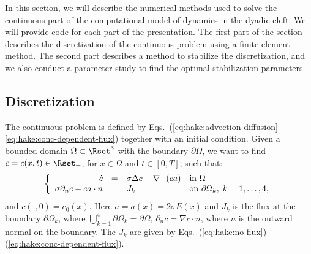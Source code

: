 In this section, we will describe the numerical methods used to solve
the continuous part of the computational model of \Ca dynamics in the
dyadic cleft. We will provide \pydolfin code for each part of the
presentation. The first part of the section describes the
discretization of the continuous problem using a finite element
method. The second part describes a method to stabilize the
discretization, and we also conduct a parameter study to find the
optimal stabilization parameters.
\subsection{Discretization}
\label{sec:hake:discretization}

The continuous problem is defined by
Eqs.~(\ref{eq:hake:advection-diffusion}~-\ref{eq:hake:conc-dependent-flux})
together with an initial condition. Given a bounded domain $\Omega
\subset \Rset^3$ with the boundary $\partial\Omega$, we want to find
$c = c(x,t) \in \Rset_+$, for $x\in \Omega$ and $t \in [0,T]$, such
that:
\begin{equation}
\label{eq:hake:full_system}
\left\{
  \begin{array}{r@{\quad=\quad}ll}
    \dot{c}&\sigma\Delta c - \nabla\cdot\left(ca\right)&  \text{in } \Omega \\
    \sigma\partial_nc-ca\cdot n&J_k& \text{on } \partial\Omega_k,\; k = 1,\ldots,4,
  \end{array}
\right.
\end{equation}
and $c(\cdot,0) = c_0(x)$. Here $a=a(x)=2\sigma E(x)$ and $J_k$ is the
\kth flux at the \kth boundary $\partial\Omega_k$, where
$\bigcup^4_{k=1}\partial\Omega_k=\partial\Omega$, $\partial_nc =
\nabla c\cdot n$, where $n$ is the outward normal on the boundary. The
$J_k$ are given by
Eqs.~(\ref{eq:hake:no-flux})-(\ref{eq:hake:conc-dependent-flux}).

